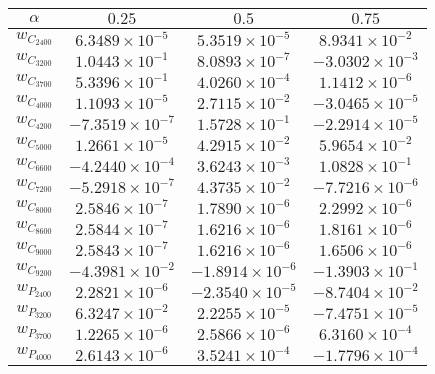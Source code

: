 \begin{table}[H]
    \centering
    \begin{tabular}{|c|c|c|c|}
        \hline
        $\alpha $ & $0.25$ & $0.5$ & $0.75$ \\
        \hline
        \(w_{C_{2400}}\)  & $6.3489 \times 10^{-5}$  & $5.3519 \times 10^{-5}$  & $8.9341 \times 10^{-2}$ \\
        \(w_{C_{3200}}\)  & $1.0443 \times 10^{-1}$  & $8.0893 \times 10^{-7}$  & $-3.0302 \times 10^{-3}$ \\
        \(w_{C_{3700}}\)  & $5.3396 \times 10^{-1}$  & $4.0260 \times 10^{-4}$  & $1.1412 \times 10^{-6}$ \\
        \(w_{C_{4000}}\)  & $1.1093 \times 10^{-5}$  & $2.7115 \times 10^{-2}$  & $-3.0465 \times 10^{-5}$ \\
        \(w_{C_{4200}}\)  & $-7.3519 \times 10^{-7}$ & $1.5728 \times 10^{-1}$  & $-2.2914 \times 10^{-5}$ \\
        \(w_{C_{5000}}\)  & $1.2661 \times 10^{-5}$  & $4.2915 \times 10^{-2}$  & $5.9654 \times 10^{-2}$ \\
        \(w_{C_{6600}}\)  & $-4.2440 \times 10^{-4}$ & $3.6243 \times 10^{-3}$  & $1.0828 \times 10^{-1}$ \\
        \(w_{C_{7200}}\)  & $-5.2918 \times 10^{-7}$ & $4.3735 \times 10^{-2}$  & $-7.7216 \times 10^{-6}$ \\
        \(w_{C_{8000}}\)  & $2.5846 \times 10^{-7}$  & $1.7890 \times 10^{-6}$  & $2.2992 \times 10^{-6}$ \\
        \(w_{C_{8600}}\) & $2.5844 \times 10^{-7}$  & $1.6216 \times 10^{-6}$  & $1.8161 \times 10^{-6}$ \\
        \(w_{C_{9000}}\) & $2.5843 \times 10^{-7}$  & $1.6216 \times 10^{-6}$  & $1.6506 \times 10^{-6}$ \\
        \(w_{C_{9200}}\) & $-4.3981 \times 10^{-2}$ & $-1.8914 \times 10^{-6}$ & $-1.3903 \times 10^{-1}$ \\
        \(w_{P_{2400}}\) & $2.2821 \times 10^{-6}$  & $-2.3540 \times 10^{-5}$ & $-8.7404 \times 10^{-2}$ \\
        \(w_{P_{3200}}\) & $6.3247 \times 10^{-2}$  & $2.2255 \times 10^{-5}$  & $-7.4751 \times 10^{-5}$ \\
        \(w_{P_{3700}}\) & $1.2265 \times 10^{-6}$  & $2.5866 \times 10^{-6}$  & $6.3160 \times 10^{-4}$ \\
        \(w_{P_{4000}}\) & $2.6143 \times 10^{-6}$  & $3.5241 \times 10^{-4}$  & $-1.7796 \times 10^{-4}$ \\

\end{tabular}
\end{table}
